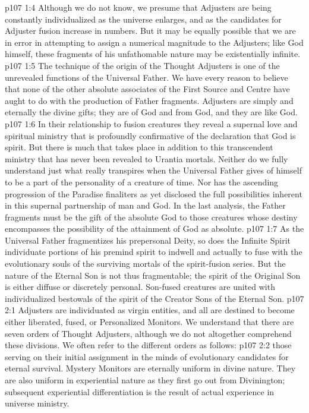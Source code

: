 \vs p107 1:4 Although we do not know, we presume that Adjusters are being constantly individualized as the universe enlarges, and as the candidates for Adjuster fusion increase in numbers. But it may be equally possible that we are in error in attempting to assign a numerical magnitude to the Adjusters; like God himself, these fragments of his unfathomable nature may be existentially infinite.
\vs p107 1:5 The technique of the origin of the Thought Adjusters is one of the unrevealed functions of the Universal Father. We have every reason to believe that none of the other absolute associates of the First Source and Centre have aught to do with the production of Father fragments. Adjusters are simply and eternally the divine gifts; they are of God and from God, and they are like God.
\vs p107 1:6 In their relationship to fusion creatures they reveal a supernal love and spiritual ministry that is profoundly confirmative of the declaration that God is spirit. But there is much that takes place in addition to this transcendent ministry that has never been revealed to Urantia mortals. Neither do we fully understand just what really transpires when the Universal Father gives of himself to be a part of the personality of a creature of time. Nor has the ascending progression of the Paradise finaliters as yet disclosed the full possibilities inherent in this supernal partnership of man and God. In the last analysis, the Father fragments must be the gift of the absolute God to those creatures whose destiny encompasses the possibility of the attainment of God as absolute.
\vs p107 1:7 \pc As the Universal Father fragmentizes his prepersonal Deity, so does the Infinite Spirit individuate portions of his premind spirit to indwell and actually to fuse with the evolutionary souls of the surviving mortals of the spirit\hyp{}fusion series. But the nature of the Eternal Son is not thus fragmentable; the spirit of the Original Son is either diffuse or discretely personal. Son\hyp{}fused creatures are united with individualized bestowals of the spirit of the Creator Sons of the Eternal Son.
\vs p107 2:1 Adjusters are individuated as virgin entities, and all are destined to become either liberated, fused, or Personalized Monitors. We understand that there are seven orders of Thought Adjusters, although we do not altogether comprehend these divisions. We often refer to the different orders as follows:
\vs p107 2:2 \bibnobreakspace {} those serving on their initial assignment in the minds of evolutionary candidates for eternal survival. Mystery Monitors are eternally uniform in divine nature. They are also uniform in experiential nature as they first go out from Divinington; subsequent experiential differentiation is the result of actual experience in universe ministry.
